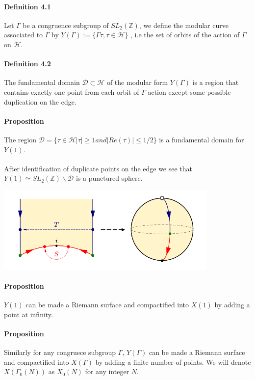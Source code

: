 \documentclass[letterpaper,10pt]{article}
\begin{document}
\paragraph{Definition 4.1} Let $\Gamma$ be a congruence subgroup of $SL_2(\mathbb{Z})$, we define the modular curve associated to $\Gamma$ by
 $Y(\Gamma) := \{ \Gamma\tau , \tau \in \mathcal{H} \}$ , i.e the set of orbits of the action of $\Gamma$ on $\mathcal{H}$.

\paragraph{Definition 4.2} The fundamental domain $\mathcal{D} \subset \mathcal{H}$ of the modular form $Y(\Gamma)$ is
a region that contains exactly one point from each orbit of $\Gamma$ action except some
possible duplication on the edge.

\paragraph{Proposition} The region $\mathcal{D} = \{ \tau \in \mathcal{H}  |\tau| \geq 1 and |Re(\tau)| \leq 1/2\}$ is a fundamental domain for $Y(1)$.

{\itshape \paragraph{} After identification of duplicate points on the edge we see that $Y(1) \simeq SL_2(\mathbb{Z})\backslash \mathcal{D}$ is a punctured sphere.
}

\includegraphics[scale=1.0]{sphere}

\paragraph{Proposition}  $Y(1)$ can be made a Riemann surface and compactified into $X(1)$ by adding a point at infinity.



\paragraph{Proposition} Similarly for any congruece subgroup $\Gamma$, $Y(\Gamma)$ can be made a Riemann surface and compactified into $X(\Gamma)$
 by adding a finite number of points. We will denote $X(\Gamma_0(N))$ as $X_0(N)$ for any integer $N$. 
\end{document}
